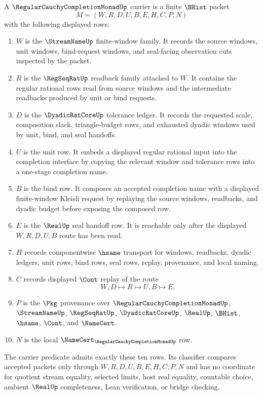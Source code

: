 \begin{definition}
\label{def:regular-cauchy-completion-monad-carrier}
A $\RegularCauchyCompletionMonadUp$ carrier is a finite $\BHist$ packet
$$
M=(W,R,D,U,B,E,H,C,P,N)
$$
with the following displayed rows:
\begin{enumerate}
\item $W$ is the $\StreamNameUp$ finite-window family. It records the source windows, unit windows, bind-request windows, and seal-facing observation cuts inspected by the packet.
\item $R$ is the $\RegSeqRatUp$ readback family attached to $W$. It contains the regular rational rows read from source windows and the intermediate readbacks produced by unit or bind requests.
\item $D$ is the $\DyadicRatCoreUp$ tolerance ledger. It records the requested scale, composition slack, triangle-budget rows, and exhausted dyadic windows used by unit, bind, and seal handoffs.
\item $U$ is the unit row. It embeds a displayed regular rational input into the completion interface by copying the relevant window and tolerance rows into a one-stage completion name.
\item $B$ is the bind row. It composes an accepted completion name with a displayed finite-window Kleisli request by replaying the source windows, readbacks, and dyadic budget before exposing the composed row.
\item $E$ is the $\RealUp$ seal handoff row. It is reachable only after the displayed $W,R,D,U,B$ route has been read.
\item $H$ records componentwise $\hsame$ transport for windows, readbacks, dyadic ledgers, unit rows, bind rows, seal rows, replay, provenance, and local naming.
\item $C$ records displayed $\Cont$ replay of the route
$$
W,D \longmapsto R \longmapsto U,B \longmapsto E .
$$
\item $P$ is the $\Pkg$ provenance over $\RegularCauchyCompletionMonadUp$, $\StreamNameUp$, $\RegSeqRatUp$, $\DyadicRatCoreUp$, $\RealUp$, $\BHist$, $\hsame$, $\Cont$, and $\NameCert$.
\item $N$ is the local $\NameCert_{\RegularCauchyCompletionMonadUp}$ row.
\end{enumerate}
The carrier predicate admits exactly these ten rows. Its classifier compares accepted packets only through $W,R,D,U,B,E,H,C,P,N$ and has no coordinate for quotient stream equality, selected limits, host real equality, countable choice, ambient $\RealUp$ completeness, Lean verification, or bridge checking.
\end{definition}


